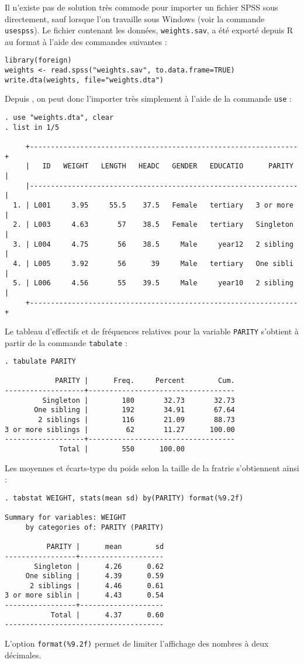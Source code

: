 \soln{\ref{exo:9.7}}
Il n'existe pas de solution très commode pour importer un fichier SPSS sous
\Stata directement, sauf lorsque l'on travaille sous Windows (voir la
commande \texttt{usespss}). Le fichier contenant les données,
\texttt{weights.sav}, a été exporté depuis R au format \Stata à l'aide des
commandes suivantes :
\begin{verbatim}
library(foreign)
weights <- read.spss("weights.sav", to.data.frame=TRUE)
write.dta(weights, file="weights.dta")
\end{verbatim}
Depuis \Stata, on peut donc l'importer très simplement à l'aide de la
commande \texttt{use} :
\begin{verbatim}
. use "weights.dta", clear
. list in 1/5

     +----------------------------------------------------------------+
     |   ID   WEIGHT   LENGTH   HEADC   GENDER   EDUCATIO      PARITY |
     |----------------------------------------------------------------|
  1. | L001     3.95     55.5    37.5   Female   tertiary   3 or more |
  2. | L003     4.63       57    38.5   Female   tertiary   Singleton |
  3. | L004     4.75       56    38.5     Male     year12   2 sibling |
  4. | L005     3.92       56      39     Male   tertiary   One sibli |
  5. | L006     4.56       55    39.5     Male     year10   2 sibling |
     +----------------------------------------------------------------+
\end{verbatim}

Le tableau d'effectifs et de fréquences relatives pour la variable
\texttt{PARITY} s'obtient à partir de la commande \texttt{tabulate} :
\begin{verbatim}
. tabulate PARITY

            PARITY |      Freq.     Percent        Cum.
-------------------+-----------------------------------
         Singleton |        180       32.73       32.73
       One sibling |        192       34.91       67.64
        2 siblings |        116       21.09       88.73
3 or more siblings |         62       11.27      100.00
-------------------+-----------------------------------
             Total |        550      100.00
\end{verbatim}
Les moyennes et écarts-type du poids selon la taille de la fratrie
s'obtiennent ainsi :
\begin{verbatim}
. tabstat WEIGHT, stats(mean sd) by(PARITY) format(%9.2f)

Summary for variables: WEIGHT
     by categories of: PARITY (PARITY)

          PARITY |      mean        sd
-----------------+--------------------
       Singleton |      4.26      0.62
     One sibling |      4.39      0.59
      2 siblings |      4.46      0.61
3 or more siblin |      4.43      0.54
-----------------+--------------------
           Total |      4.37      0.60
--------------------------------------
\end{verbatim}
L'option \verb|format(%9.2f)| permet de limiter l'affichage des nombres à
deux décimales.

